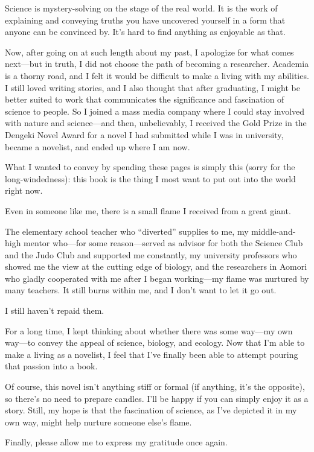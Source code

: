 \documentclass[
    a4paper,
    12pt,
    twoside,
    openany,
    UTF8,
    fontset=windows
]{ctexbook}
\begin{document}
Science is mystery-solving on the stage of the real world. It is the work of explaining and conveying truths you have uncovered yourself in a form that anyone can be convinced by. It's hard to find anything as enjoyable as that.

Now, after going on at such length about my past, I apologize for what comes next---but in truth, I did not choose the path of becoming a researcher. Academia is a thorny road, and I felt it would be difficult to make a living with my abilities. I still loved writing stories, and I also thought that after graduating, I might be better suited to work that communicates the significance and fascination of science to people. So I joined a mass media company where I could stay involved with nature and science---and then, unbelievably, I received the Gold Prize in the Dengeki Novel Award for a novel I had submitted while I was in university, became a novelist, and ended up where I am now.

What I wanted to convey by spending these pages is simply this (sorry for the long-windedness): this book is the thing I most want to put out into the world right now.

Even in someone like me, there is a small flame I received from a great giant.

The elementary school teacher who ``diverted'' supplies to me, my middle-and-high mentor who---for some reason---served as advisor for both the Science Club and the Judo Club and supported me constantly, my university professors who showed me the view at the cutting edge of biology, and the researchers in Aomori who gladly cooperated with me after I began working---my flame was nurtured by many teachers. It still burns within me, and I don't want to let it go out.

I still haven't repaid them.

For a long time, I kept thinking about whether there was some way---my own way---to convey the appeal of science, biology, and ecology. Now that I'm able to make a living as a novelist, I feel that I've finally been able to attempt pouring that passion into a book.

Of course, this novel isn't anything stiff or formal (if anything, it's the opposite), so there's no need to prepare candles. I'll be happy if you can simply enjoy it as a story. Still, my hope is that the fascination of science, as I've depicted it in my own way, might help nurture someone else's flame.

Finally, please allow me to express my gratitude once again.
\end{document}
